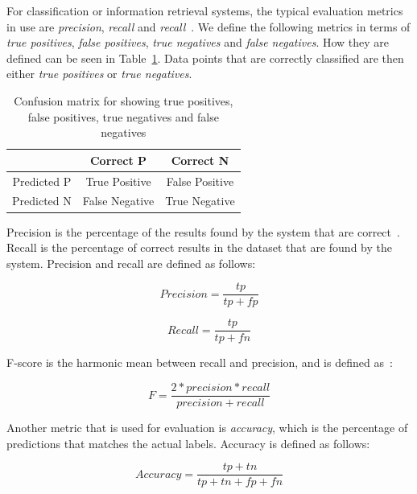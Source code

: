 For classification or information retrieval systems, the typical evaluation metrics in use are \textit{precision}, \textit{recall} and \textit{recall}~\cite{jiang2012information}.
We define the following metrics in terms of \textit{true positives}, \textit{false positives}, \textit{true negatives} and \textit{false negatives}.
How they are defined can be seen in Table~\ref{tab:conf-matr}.
Data points that are correctly classified are then either \textit{true positives} or \textit{true negatives}.

\begin{table}
    \begin{center}
        \begin{tabular}{c c c}
            & Correct P & Correct N \\
            \toprule
            Predicted P & True Positive & False Positive \\
            Predicted N & False Negative & True Negative \\
        \end{tabular}
    \end{center}
    \caption{Confusion matrix for showing true positives, false positives, true negatives and false negatives}\label{tab:conf-matr}
\end{table}

Precision is the percentage of the results found by the system that are correct~\cite{tjong2003introduction}.
Recall is the percentage of correct results in the dataset that are found by the system.
Precision and recall are defined as follows:

\begin{equation}
    Precision = \frac{tp}{tp+fp}
\end{equation}

\begin{equation}
    Recall = \frac{tp}{tp+fn}
\end{equation}

F-score is the harmonic mean between recall and precision, and is defined as~\cite{tjong2003introduction}:

\begin{equation}
    F = \frac{2*precision*recall}{precision+recall}
\end{equation}

Another metric that is used for evaluation is \textit{accuracy}, which is the percentage of predictions that matches the actual labels.
Accuracy is defined as follows:

\begin{equation}
    Accuracy = \frac{tp+tn}{tp+tn+fp+fn}
\end{equation}

